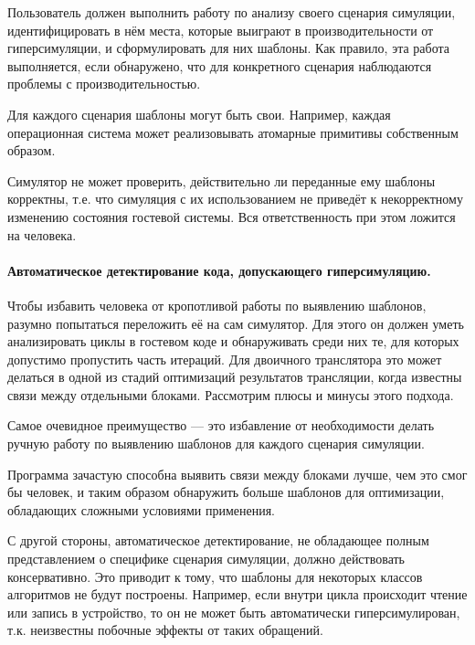 \begin{itemize*}
    \item Пользователь должен выполнить работу по анализу своего сценария симуляции, идентифицировать в нём места, которые выиграют в производительности от гиперсимуляции, и сформулировать для них шаблоны. Как правило, эта работа выполняется, если обнаружено, что для конкретного сценария наблюдаются проблемы с производительностью. 
    \item Для каждого сценария шаблоны могут быть свои. Например, каждая операционная система может реализовывать атомарные примитивы собственным образом.
    \item Симулятор не может проверить, действительно ли переданные ему шаблоны корректны, т.е. что симуляция с их использованием не приведёт к некорректному изменению состояния гостевой системы. Вся ответственность при этом ложится на человека.
\end{itemize*}

\paragraph{Автоматическое детектирование кода, допускающего гиперсимуляцию.} Чтобы избавить человека от кропотливой работы по выявлению шаблонов, разумно попытаться переложить её на сам симулятор. Для этого он должен уметь анализировать циклы в гостевом коде и обнаруживать среди них те, для которых допустимо пропустить часть итераций. Для двоичного транслятора это может делаться в одной из стадий оптимизаций результатов трансляции, когда известны связи между отдельными блоками. Рассмотрим плюсы и минусы этого подхода.

\begin{itemize*}
    \item Самое очевидное преимущество --- это избавление от необходимости делать ручную работу по выявлению шаблонов для каждого сценария симуляции.
    \item Программа зачастую способна выявить связи между блоками лучше, чем это смог бы человек, и таким образом обнаружить больше шаблонов для оптимизации, обладающих сложными условиями применения.
    \item С другой стороны, автоматическое детектирование, не обладающее полным представлением о специфике сценария симуляции, должно действовать консервативно. Это приводит к тому, что шаблоны для некоторых классов алгоритмов не будут построены. Например, если внутри цикла происходит чтение или запись в устройство, то он не может быть автоматически гиперсимулирован, т.к. неизвестны побочные эффекты от таких обращений.
\end{itemize*}

